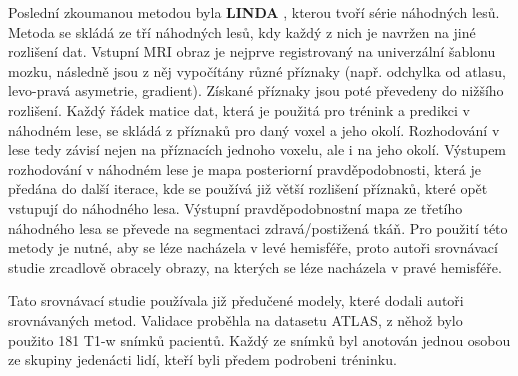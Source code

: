 \documentclass[11pt]{article}
\begin{document}
Poslední zkoumanou metodou byla \textbf{LINDA} \cite{LINDA}, kterou tvoří série \alert{náhodných lesů}. Metoda se skládá ze tří náhodných lesů, kdy každý z nich je navržen na jiné rozlišení dat. Vstupní MRI obraz je nejprve registrovaný na univerzální šablonu mozku, následně jsou z něj vypočítány různé \alert{příznaky} (např. odchylka od atlasu, levo-pravá asymetrie, gradient). Získané příznaky jsou poté převedeny do nižšího rozlišení. Každý řádek matice dat, která je použitá pro trénink a predikci v náhodném lese, se skládá z příznaků pro daný \alert{voxel} a jeho okolí. Rozhodování v lese tedy závisí nejen na příznacích jednoho voxelu, ale i na jeho okolí. Výstupem rozhodování v náhodném lese je \alert{mapa posteriorní pravděpodobnosti}, která je předána do další iterace, kde se používá již větší rozlišení příznaků, které opět vstupují do náhodného lesa. Výstupní pravděpodobnostní mapa ze třetího náhodného lesa se převede na segmentaci zdravá/postižená tkáň. Pro použití této metody je nutné, aby se léze nacházela v levé hemisféře, proto autoři srovnávací studie zrcadlově obracely obrazy, na kterých se léze nacházela v pravé hemisféře.

Tato srovnávací studie používala již předučené modely, které dodali autoři srovnávaných metod. Validace proběhla na \alert{datasetu ATLAS}, z něhož bylo použito 181 T1-w snímků pacientů. Každý ze snímků byl anotován jednou osobou ze skupiny jedenácti lidí, kteří byli předem podrobeni tréninku.
\end{document}
